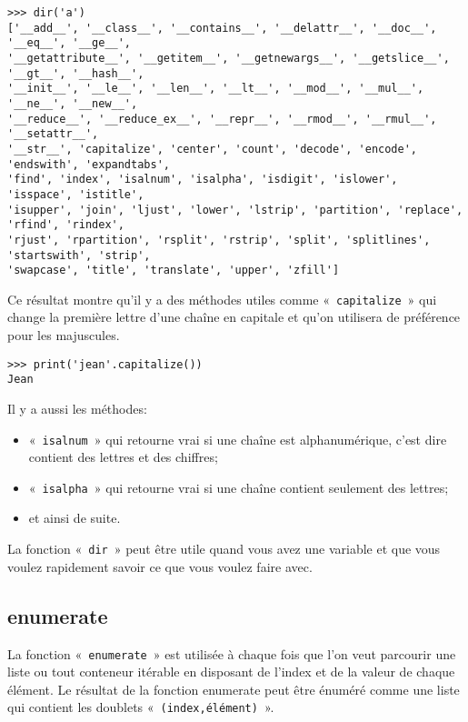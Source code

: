 \begin{small}
\begin{Verbatim}[frame=single,rulecolor=\color{gray}]
>>> dir('a')
['__add__', '__class__', '__contains__', '__delattr__', '__doc__', '__eq__', '__ge__', 
'__getattribute__', '__getitem__', '__getnewargs__', '__getslice__', '__gt__', '__hash__',
'__init__', '__le__', '__len__', '__lt__', '__mod__', '__mul__', '__ne__', '__new__', 
'__reduce__', '__reduce_ex__', '__repr__', '__rmod__', '__rmul__', '__setattr__', 
'__str__', 'capitalize', 'center', 'count', 'decode', 'encode', 'endswith', 'expandtabs', 
'find', 'index', 'isalnum', 'isalpha', 'isdigit', 'islower', 'isspace', 'istitle', 
'isupper', 'join', 'ljust', 'lower', 'lstrip', 'partition', 'replace', 'rfind', 'rindex', 
'rjust', 'rpartition', 'rsplit', 'rstrip', 'split', 'splitlines', 'startswith', 'strip', 
'swapcase', 'title', 'translate', 'upper', 'zfill']
\end{Verbatim}
\end{small}

Ce résultat montre qu'il y a des méthodes utiles comme «~\texttt{capitalize}~» qui change la première lettre d'une chaîne en capitale et qu'on utilisera de préférence pour les majuscules.

\begin{Verbatim}[frame=single,rulecolor=\color{gray}]
>>> print('jean'.capitalize())
Jean
\end{Verbatim}

Il y a aussi les méthodes:
\begin{itemize} 
\item «~\texttt{isalnum}~» qui retourne vrai si une chaîne est alphanumérique, c'est dire contient des lettres et des chiffres;
\item «~\texttt{isalpha}~» qui retourne vrai si une chaîne contient seulement des lettres;
\item et ainsi de suite.
\end{itemize}  

La fonction «~\texttt{dir}~» peut être utile quand vous avez une variable et que vous voulez rapidement savoir ce que vous voulez faire avec.


\subsection*{enumerate}
La fonction «~\texttt{enumerate}~» est utilisée à chaque fois que l'on veut parcourir une liste ou tout conteneur itérable en disposant de l'index et de la valeur de chaque élément. Le résultat de la fonction enumerate peut être énuméré comme une liste qui contient les doublets «~\texttt{(index,élément)}~». 

